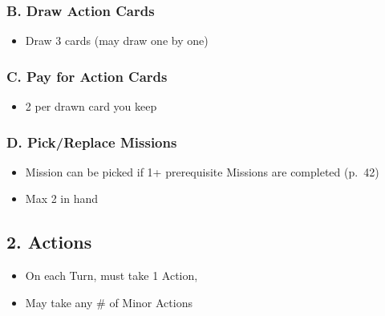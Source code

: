 \documentclass[10pt]{article}
\begin{document}
\subsubsection*{B. Draw Action Cards}

\begin{itemize}
	\item Draw 3 cards (may draw one by one)
\end{itemize}

\subsubsection*{C. Pay for Action Cards}
\begin{itemize}
	\item 2 \ducats per drawn card you keep
\end{itemize}

\subsubsection*{D. Pick/Replace Missions}
\begin{itemize}
	\item Mission can be picked if 1+ prerequisite Missions are completed (p.~42)
	\item Max 2 in hand
\end{itemize}

\subsection*{2. Actions}
\begin{itemize}
	\item On each Turn, must take 1 Action, 
	\item May take any \# of Minor Actions
\end{itemize}
\end{document}
